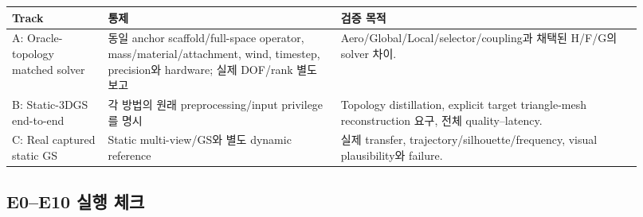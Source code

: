 \documentclass[10pt,a4paper]{article}
\begin{document}
\begin{longtable}{L{0.14\linewidth}L{0.34\linewidth}L{0.44\linewidth}}
\toprule
Track & 통제 & 검증 목적 \\
\midrule
A: Oracle-topology matched solver & 동일 anchor scaffold/full-space operator, mass/material/attachment, wind, timestep, precision와 hardware; 실제 DOF/rank 별도 보고 & Aero/Global/Local/selector/coupling과 채택된 H/F/G의 solver 차이. \\
B: Static-3DGS end-to-end & 각 방법의 원래 preprocessing/input privilege를 명시 & Topology distillation, explicit target triangle-mesh reconstruction 요구, 전체 quality--latency. \\
C: Real captured static GS & Static multi-view/GS와 별도 dynamic reference & 실제 transfer, trajectory/silhouette/frequency, visual plausibility와 failure. \\
\bottomrule
\end{longtable}

\subsection*{E0--E10 실행 체크}
\end{document}
